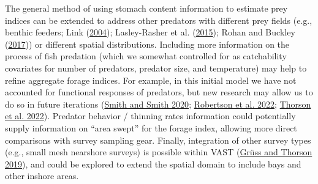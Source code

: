 \documentclass[
]{article}
\begin{document}
The general method of using stomach content information to estimate prey indices can be extended to address other predators with different prey fields (e.g., benthic feeders; Link (\protect\hyperlink{ref-link_using_2004}{2004}); Lasley-Rasher et al. (\protect\hyperlink{ref-lasley-rasher_it_2015}{2015}); Rohan and Buckley (\protect\hyperlink{ref-rohan_spatial_2017}{2017})) or different spatial distributions. Including more information on the process of fish predation (which we somewhat controlled for as catchability covariates for number of predators, predator size, and temperature) may help to refine aggregate forage indices. For example, in this initial model we have not accounted for functional responses of predators, but new research may allow us to do so in future iterations (\protect\hyperlink{ref-smith_multispecies_2020}{Smith and Smith 2020}; \protect\hyperlink{ref-robertson_accounting_2022}{Robertson et al. 2022}; \protect\hyperlink{ref-thorson_diet_2022}{Thorson et al. 2022}). Predator behavior / thinning rates information could potentially supply information on ``area swept'' for the forage index, allowing more direct comparisons with survey sampling gear. Finally, integration of other survey types (e.g., small mesh nearshore surveys) is possible within VAST (\protect\hyperlink{ref-gruss_developing_2019}{Grüss and Thorson 2019}), and could be explored to extend the spatial domain to include bays and other inshore areas.
\end{document}
